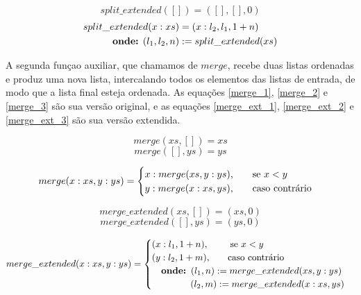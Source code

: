 \documentclass[12pt, oneside, a4paper,english,brazil]{abntex2}
\begin{document}
\newpage

\begin{equation}\label{split_ext_base}
  split\_extended([]) = ([], [], 0)
\end{equation}
\begin{equation}\label{split_ext_ind}
\begin{split}
  split\_extended(x : xs) &= (x : l_{2}, l_{1}, 1 + n)\\
  \text{\textbf{onde:} } (l_{1}, l_{2}, n) &:= split\_extended(xs)
\end{split}
\end{equation}


\qquad A segunda fun\c{c}ao auxiliar, que chamamos de $merge$, recebe duas listas
ordenadas e produz uma nova lista, intercalando todos os elementos das listas
de entrada, de modo que a lista final esteja ordenada. As equa\c{c}\~oes \ref{merge_1},
\ref{merge_2} e \ref{merge_3} s\~ao sua vers\~ao original, e as equa\c{c}\~oes
\ref{merge_ext_1}, \ref{merge_ext_2} e \ref{merge_ext_3} s\~ao sua vers\~ao extendida.

\begin{equation} \label{merge_1}
merge(xs, []) = xs
\end{equation}
\begin{equation} \label{merge_2}
merge([], ys) = ys
\end{equation}

\begin{equation} \label{merge_3}
merge(x : xs, y : ys) =
     \begin{cases}
       x : merge(xs, y : ys) \text{,\qquad se $x < y$} \\
       y : merge(x : xs, ys) \text{,\qquad caso contr\'ario}
     \end{cases}
\end{equation}

\begin{equation} \label{merge_ext_1}
merge\_extended(xs, []) = (xs, 0)
\end{equation}
\begin{equation} \label{merge_ext_2}
merge\_extended([], ys) = (ys, 0)
\end{equation}

\begin{equation} \label{merge_ext_3}
merge\_extended(x : xs, y : ys) =
     \begin{cases}
       (x : l_{1}, 1 + n) \text{,\qquad \, se $x < y$} \\
       (y : l_{2}, 1 + m) \text{,\qquad caso contr\'ario} \\
       \text{\quad \textbf{onde: }} (l_{1}, n) := merge\_extended(xs, y : ys) \\
       \text{\qquad \quad \,\,\,\,\, } (l_{2}, m) := merge\_extended(x : xs, ys)
     \end{cases}
\end{equation}
\end{document}
